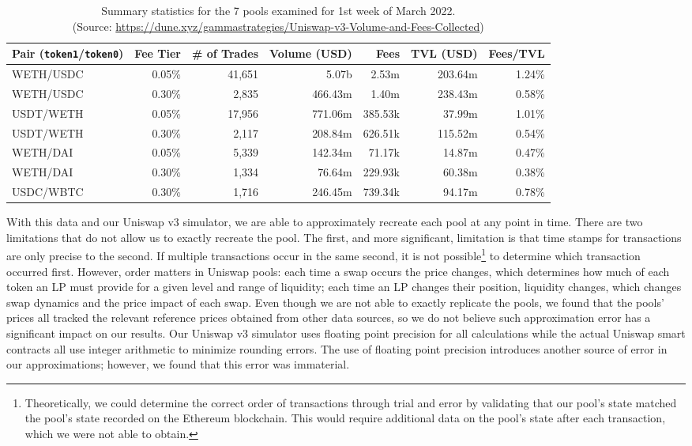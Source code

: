 \documentclass[11pt]{article}
\begin{document}
\vspace{0.5cm}
\begin{table}[H]
    \scriptsize
    \centering
    \captionsetup{justification=centering}
    \begin{tabular}{lrrrrrr}
        \toprule
        Pair (\texttt{token1}/\texttt{token0}) & Fee Tier & \# of Trades & Volume (USD) & Fees & TVL (USD) & Fees/TVL \\
        \midrule
        WETH/USDC & 0.05\% & 41,651 & 5.07b & 2.53m & 203.64m & 1.24\% \\
        WETH/USDC & 0.30\% & 2,835 & 466.43m & 1.40m & 238.43m & 0.58\% \\
        USDT/WETH & 0.05\% & 17,956 & 771.06m & 385.53k & 37.99m & 1.01\% \\
        USDT/WETH & 0.30\% & 2,117 & 208.84m & 626.51k & 115.52m & 0.54\% \\
        WETH/DAI & 0.05\% & 5,339 & 142.34m & 71.17k & 14.87m & 0.47\% \\
        WETH/DAI & 0.30\% & 1,334 & 76.64m & 229.93k & 60.38m & 0.38\% \\
        USDC/WBTC & 0.30\% & 1,716 & 246.45m & 739.34k & 94.17m & 0.78\% \\
        \bottomrule
    \end{tabular}
    \caption{Summary statistics for the 7 pools examined for 1st week of March 2022. \\
    (Source: \url{https://dune.xyz/gammastrategies/Uniswap-v3-Volume-and-Fees-Collected})}
    \label{tab:summary_statistics}
\end{table}

With this data and our Uniswap v3 simulator, we are able to approximately recreate each pool at any point in time. There are two limitations that do not allow us to exactly recreate the pool. The first, and more significant, limitation is that time stamps for transactions are only precise to the second. If multiple transactions occur in the same second, it is not possible\footnote{Theoretically, we could determine the correct order of transactions through trial and error by validating that our pool's state matched the pool's state recorded on the Ethereum \gls{blockchain}. This would require additional data on the pool's state after each transaction, which we were not able to obtain.} to determine which transaction occurred first. However, order matters in Uniswap pools: each time a swap occurs the price changes, which determines how much of each token an LP must provide for a given level and range of liquidity; each time an LP changes their position, liquidity changes, which changes swap dynamics and the price impact of each swap. Even though we are not able to exactly replicate the pools, we found that the pools' prices all tracked the relevant reference prices obtained from other data sources, so we do not believe such approximation error has a significant impact on our results. Our Uniswap v3 simulator uses floating point precision for all calculations while the actual Uniswap smart contracts all use integer arithmetic to minimize rounding errors. The use of floating point precision introduces another source of error in our approximations; however, we found that this error was immaterial.
\end{document}

